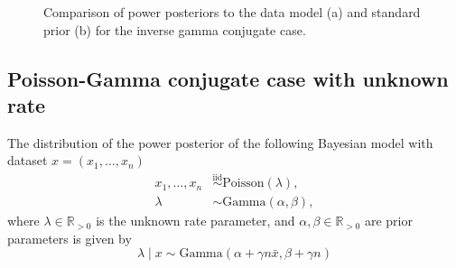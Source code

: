 \documentclass[12pt]{article}
\begin{document}
\FloatBarrier
\begin{figure}[ht!]
    \centering
    \hfill %

    \caption{Comparison of power posteriors to the data model (a) and standard prior (b) for the inverse gamma conjugate case.}
    \label{fig:ing_conju}
\end{figure}


\subsection{Poisson-Gamma conjugate case with unknown rate}
The distribution of the power posterior of the following Bayesian model with
dataset $x = (x_1, \ldots, x_n)$ 
\begin{subequations}
\begin{align}
x_1, \ldots, x_n &\overset{\mathrm{iid}}{\sim} \text{Poisson}(\lambda), \\
\lambda &\sim \text{Gamma}(\alpha, \beta),
\end{align}
\end{subequations}
where $\lambda \in \mathbb{R}_{>0}$ is the unknown rate parameter, and $\alpha,
\beta \in \mathbb{R}_{>0}$ are prior parameters is given by
\begin{equation}
\lambda \; | \; x \sim \text{Gamma} \left( \alpha + \gamma n \bar{x}, \beta + \gamma n \right)
\end{equation}
\end{document}
